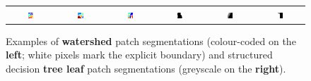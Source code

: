 \begin{figure}[ht!]
\begin{center}
\begin{tabular}{ cccccc }
  \includegraphics[width=0.13\textwidth,frame]{images/SE-SV-UCM/watershed-patches/watershed-patch13.png} &
  \includegraphics[width=0.13\textwidth,frame]{images/SE-SV-UCM/watershed-patches/watershed-patch14.png} &
  \includegraphics[width=0.13\textwidth,frame]{images/SE-SV-UCM/watershed-patches/watershed-patch15.png} &
  \includegraphics[width=0.13\textwidth,frame]{images/SE-SV-UCM/leaf-patches/leaf-patch-3-segms1.png} &
  \includegraphics[width=0.13\textwidth,frame]{images/SE-SV-UCM/leaf-patches/leaf-patch-3-segms2.png} &
  \includegraphics[width=0.13\textwidth,frame]{images/SE-SV-UCM/leaf-patches/leaf-patch-3-segms3.png} \\
  \end{tabular}
\end{center}
\caption{Examples of \textbf{watershed} patch segmentations (colour-coded on the \textbf{left}; white pixels mark the explicit boundary) and structured decision \textbf{tree leaf} patch segmentations (greyscale on the \textbf{right}).}
\label{fig:watershed-and-leaf-patches}
\end{figure}

